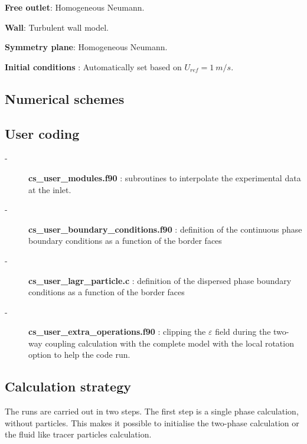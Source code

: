 \begin{itemize}
\begin{description}
\begin{description}
         \end{description}

   \item[-]\textbf{Free outlet}: Homogeneous Neumann.
   \item[-]\textbf{Wall}: Turbulent wall model.
   \item[-]\textbf{Symmetry plane}: Homogeneous Neumann. 

   \item[-]\textbf{Initial conditions} : Automatically set based on $U_{ref}=1~m/s$.
\end{description}

\end{itemize}

\subsection{Numerical schemes}


\subsection{User coding}

\begin{description}

   \item[-] \textbf{cs\_user\_modules.f90} : subroutines to interpolate the experimental data at the inlet.
   
   \item[-] \textbf{cs\_user\_boundary\_conditions.f90} : definition of the continuous phase boundary conditions as a function of the border faces
   
   \item[-] \textbf{cs\_user\_lagr\_particle.c} : definition of the dispersed phase boundary conditions as a function of the border faces
   
   \item[-] \textbf{cs\_user\_extra\_operations.f90} : clipping the $\varepsilon$ field during the two-way coupling calculation with the complete model with the local rotation option to help the code run.

\end{description}

\subsection{Calculation strategy}

The runs are carried out in two steps. The first step is a single phase calculation, without particles. This makes it possible to initialise the two-phase calculation or the fluid like tracer particles calculation.\\ 

